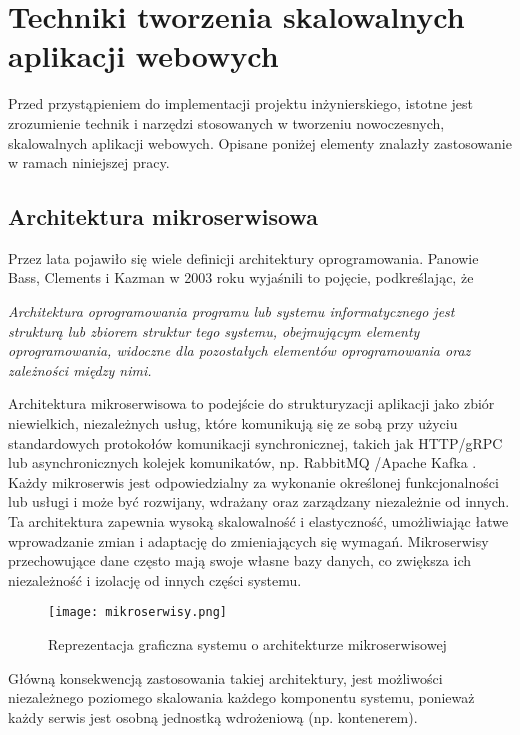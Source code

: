 \clearpage
\section{Techniki tworzenia skalowalnych aplikacji webowych}

Przed przystąpieniem do implementacji projektu inżynierskiego, istotne jest zrozumienie technik i narzędzi stosowanych w tworzeniu nowoczesnych, skalowalnych aplikacji webowych. Opisane poniżej elementy znalazły zastosowanie w ramach niniejszej pracy.

\subsection{Architektura mikroserwisowa}

Przez lata pojawiło się wiele definicji architektury oprogramowania. Panowie Bass, Clements i Kazman w 2003 roku \cite{bass2012software} wyjaśnili to pojęcie, podkreślając, że

\begin{displayquote}
\emph{Architektura oprogramowania programu lub systemu informatycznego jest strukturą lub zbiorem struktur tego systemu, obejmującym elementy oprogramowania, widoczne dla pozostałych elementów oprogramowania oraz zależności między nimi.}
\end{displayquote}

Architektura mikroserwisowa to podejście do strukturyzacji aplikacji jako zbiór niewielkich, niezależnych usług, które komunikują się ze sobą przy użyciu standardowych protokołów komunikacji synchronicznej, takich jak HTTP\cite{http}/gRPC \cite{grpc} lub asynchronicznych kolejek komunikatów, np. RabbitMQ \cite{rabbitmq}/Apache Kafka \cite{kafka}. Każdy mikroserwis jest odpowiedzialny za wykonanie określonej funkcjonalności lub usługi i może być rozwijany, wdrażany oraz zarządzany niezależnie od innych. Ta architektura zapewnia wysoką skalowalność i elastyczność, umożliwiając łatwe wprowadzanie zmian i adaptację do zmieniających się wymagań. Mikroserwisy przechowujące dane często mają swoje własne bazy danych, co zwiększa ich niezależność i izolację od innych części systemu.

\begin{figure}[!h]
    \centering \texttt{[image: mikroserwisy.png]}
    \caption{Reprezentacja graficzna systemu o architekturze mikroserwisowej \cite{microservices_rys}}
\end{figure}


Główną konsekwencją zastosowania takiej architektury, jest możliwości niezależnego poziomego skalowania każdego komponentu systemu, ponieważ każdy serwis jest osobną jednostką wdrożeniową (np. kontenerem).

